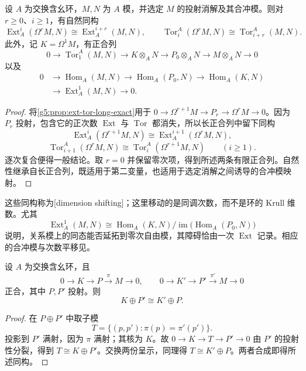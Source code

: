 \begin{proposition}\label{g5:prop:dimension-shifting}
	设 \(A\) 为交换含幺环，\(M,N\) 为 \(A\) 模，并选定 \(M\) 的投射消解及其合冲模。则对 \(r\geq0\)、\(i\geq1\)，有自然同构
	\[
		\operatorname{Ext}^i_A(\Omega^rM,N)
		\cong\operatorname{Ext}^{i+r}_A(M,N),\qquad
		\operatorname{Tor}_i^A(\Omega^rM,N)
		\cong\operatorname{Tor}_{i+r}^A(M,N).
	\]
	此外，记 \(K=\Omega^1M\)，有正合列
	\[
		0\longrightarrow\operatorname{Tor}_1^A(M,N)
		\longrightarrow K\otimes_A N
		\longrightarrow P_0\otimes_A N
		\longrightarrow M\otimes_A N\longrightarrow0
	\]
	以及
	\[
		\begin{aligned}
			0&\longrightarrow\operatorname{Hom}_A(M,N)
			\longrightarrow\operatorname{Hom}_A(P_0,N)
			\longrightarrow\operatorname{Hom}_A(K,N)\\
			&\longrightarrow\operatorname{Ext}^1_A(M,N)
			\longrightarrow0.
		\end{aligned}
	\]
\end{proposition}
\begin{proof}
	将\cref{g5:prop:ext-tor-long-exact}用于
	\(0\to\Omega^{r+1}M\to P_r\to\Omega^rM\to0\)。因为 \(P_r\) 投射，包含它的正次数 \(\operatorname{Ext}\) 与 \(\operatorname{Tor}\) 都消失，所以长正合列中留下同构
	\[
		\operatorname{Ext}^i_A(\Omega^{r+1}M,N)
		\cong\operatorname{Ext}^{i+1}_A(\Omega^rM,N),
	\]
	\[
		\operatorname{Tor}_{i+1}^A(\Omega^rM,N)
		\cong\operatorname{Tor}_i^A(\Omega^{r+1}M,N)
		\qquad(i\geq1).
	\]
	逐次复合便得一般结论。取 \(r=0\) 并保留零次项，得到所述两条有限正合列。自然性继承自长正合列，既适用于第二变量，也适用于选定消解之间诱导的合冲模映射。
\end{proof}

这些同构称为[dimension shifting]；这里移动的是同调次数，而不是环的 Krull 维数。尤其
\[
	\operatorname{Ext}^1_A(M,N)
	\cong
	\operatorname{Hom}_A(K,N)/
	\operatorname{im}\bigl(\operatorname{Hom}_A(P_0,N)\bigr)
\]
说明，关系模上的同态能否延拓到零次自由模，其障碍恰由一次 \(\operatorname{Ext}\) 记录。相应的合冲模与次数平移见\cite[附录B，第280页]{Matsumura1989}。

\begin{proposition}\label{g5:prop:syzygy-stable}
	设 \(A\) 为交换含幺环，且
	\[
		0\to K\to P\xrightarrow{\pi}M\to0,\qquad
		0\to K'\to P'\xrightarrow{\pi'}M\to0
	\]
	正合，其中 \(P,P'\) 投射。则
	\[
		K\oplus P'\cong K'\oplus P.
	\]
\end{proposition}
\begin{proof}
	在 \(P\oplus P'\) 中取子模
	\[
		T=\{(p,p'):\pi(p)=\pi'(p')\}.
	\]
	投影到 \(P'\) 满射，因为 \(\pi\) 满射；其核为 \(K\)。故
	\(0\to K\to T\to P'\to0\) 由 \(P'\) 的投射性分裂，得到 \(T\cong K\oplus P'\)。交换两份呈示，同理得 \(T\cong K'\oplus P\)。两者合成即得所述同构。
\end{proof}

